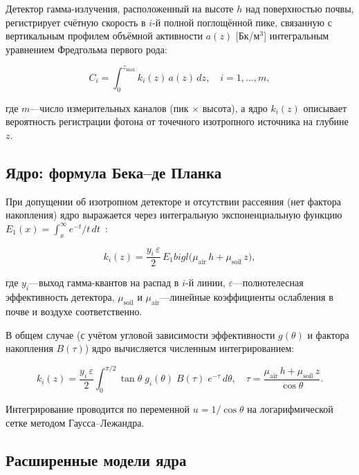 \documentclass[12pt,a4paper]{article}
\newcommand{\Eone}{E_{1}}
\begin{document}
Детектор гамма-излучения, расположенный на высоте $h$ над поверхностью
почвы, регистрирует счётную скорость в $i$-й полной поглощённой пике,
связанную с вертикальным профилем объёмной активности $a(z)$
[Бк/м$^3$] интегральным уравнением Фредгольма первого рода:

\begin{equation}
  C_i = \int_{0}^{z_{\max}} k_i(z)\, a(z)\, dz,\quad i = 1, \ldots, m,
  \label{eq:fredholm}
\end{equation}

где $m$---число измерительных каналов (пик $\times$ высота),
а ядро $k_i(z)$ описывает вероятность регистрации фотона
от точечного изотропного источника на глубине $z$.

\subsection{Ядро: формула Бека--де Планка}
\label{sub:kernel}

При допущении об изотропном детекторе и отсутствии рассеяния
(нет фактора накопления) ядро выражается через интегральную
экспоненциальную функцию $\Eone(x) = \int_x^\infty e^{-t}/t\, dt$~\citep{Beck1968}:

\begin{equation}
  k_i(z) = \frac{y_i\, \varepsilon}{2}\, \Eone\!bigl(\mu_{\mathrm{air}}\, h + \mu_{\mathrm{soil}}\, z\bigr),
  \label{eq:kernel_analytic}
\end{equation}

где $y_i$---выход гамма-квантов на распад в $i$-й линии,
$\varepsilon$---полнотелесная эффективность детектора,
$\mu_{\mathrm{soil}}$ и $\mu_{\mathrm{air}}$---линейные коэффициенты
ослабления в почве и воздухе соответственно.

В общем случае (с учётом угловой зависимости эффективности $g(\theta)$
и фактора накопления $B(\tau)$) ядро вычисляется численным интегрированием:

\begin{equation}
  k_i(z) = \frac{y_i\, \varepsilon}{2}
  \int_{0}^{\pi/2} \tan\theta\; g_i(\theta)\; B(\tau)\; e^{-\tau}\, d\theta,\quad
  \tau = \frac{\mu_{\mathrm{air}}\, h + \mu_{\mathrm{soil}}\, z}{\cos\theta}.
  \label{eq:kernel_full}
\end{equation}

Интегрирование проводится по переменной $u = 1/\cos\theta$ на
логарифмической сетке методом Гаусса--Лежандра.

\subsection{Расширенные модели ядра}
\label{sub:extended_kernels}
\end{document}
